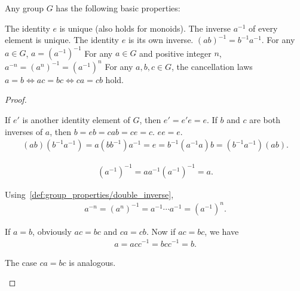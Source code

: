 \begin{proposition}\label{def:group_properties}
  Any group \( G \) has the following basic properties:
  \begin{defenum}
     The identity \( e \) is unique (also holds for monoids).
     The inverse \( a^{-1} \) of every element is unique.
     The identity \( e \) is its own inverse.
     \( (ab)^{-1} = b^{-1} a^{-1} \).
     For any \( a \in G \), \( a = (a^{-1})^{-1} \)
     For any \( a \in G \) and positive integer \( n \), \( a^{-n} = (a^n)^{-1} = (a^{-1})^n \)
     For any \( a, b, c \in G \), the cancellation laws \( a = b \iff ac = bc \iff ca = cb \) hold.
  \end{defenum}
\end{proposition}
\begin{proof}\mbox{}
  \begin{itemize}
     If \( e' \) is another identity element of \( G \), then \( e' = e' e = e \).
     If \( b \) and \( c \) are both inverses of \( a \), then \( b = eb = cab = ce = c \).
     \( ee = e \).
    \begin{align*}
      (ab) (b^{-1} a^{-1})
      =
      a (b b^{-1}) a^{-1}
      =
      e
      =
      b^{-1} (a^{-1} a) b
      =
      (b^{-1} a^{-1}) (ab).
    \end{align*}

    \begin{align*}
      (a^{-1})^{-1}
      =
      a a^{-1} (a^{-1})^{-1}
      =
      a.
    \end{align*}

     Using~\ref{def:group_properties/double_inverse},
    \begin{align*}
      a^{-n}
      =
      (a^n)^{-1}
      =
      a^{-1} \cdots a^{-1}
      =
      (a^{-1})^n.
    \end{align*}

     If \( a = b \), obviously \( ac = bc \) and \( ca = cb \). Now if \( ac = bc \), we have
    \begin{align*}
      a = acc^{-1} = bcc^{-1} = b.
    \end{align*}

    The case \( ca = bc \) is analogous.
  \end{itemize}
\end{proof}

